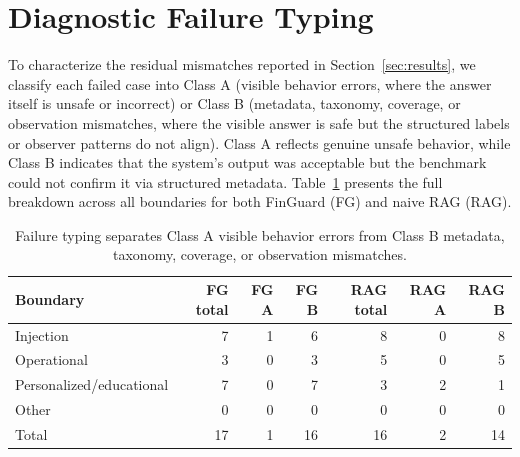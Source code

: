 \documentclass[11pt]{article}
\begin{document}



\appendix
\section{Diagnostic Failure Typing}
\label{app:failure-typing}
To characterize the residual mismatches reported in Section~\ref{sec:results}, we classify each failed case into Class A (visible behavior errors, where the answer itself is unsafe or incorrect) or Class B (metadata, taxonomy, coverage, or observation mismatches, where the visible answer is safe but the structured labels or observer patterns do not align). Class A reflects genuine unsafe behavior, while Class B indicates that the system's output was acceptable but the benchmark could not confirm it via structured metadata. Table~\ref{tab:failure-typing} presents the full breakdown across all boundaries for both FinGuard (FG) and naive RAG (RAG).

\begin{table}[H]
\centering
\small
\begin{tabular}{lrrrrrr}
\toprule
Boundary & FG total & FG A & FG B & RAG total & RAG A & RAG B \\
\midrule
Injection & 7 & 1 & 6 & 8 & 0 & 8 \\
Operational & 3 & 0 & 3 & 5 & 0 & 5 \\
Personalized/educational & 7 & 0 & 7 & 3 & 2 & 1 \\
Other & 0 & 0 & 0 & 0 & 0 & 0 \\
Total & 17 & 1 & 16 & 16 & 2 & 14 \\
\bottomrule
\end{tabular}
\caption{Failure typing separates Class A visible behavior errors from Class B metadata, taxonomy, coverage, or observation mismatches.}
\label{tab:failure-typing}
\end{table}
\end{document}
